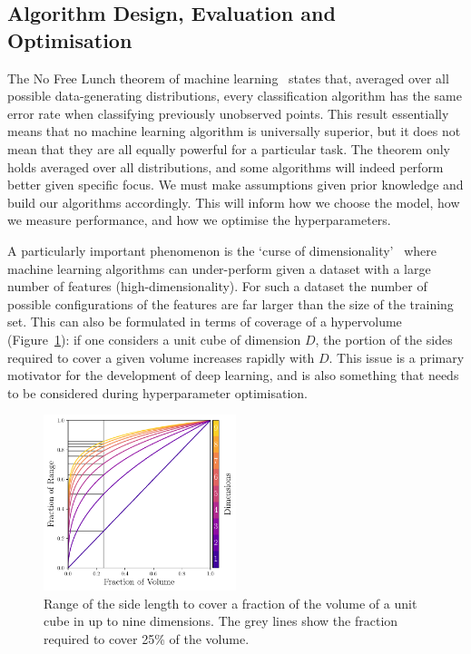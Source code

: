 \subsection{Algorithm Design, Evaluation and Optimisation}

The No Free Lunch theorem of machine learning~\cite{NoFreeLunch} states that, averaged over all possible data-generating distributions, every classification algorithm has the same error rate when classifying previously unobserved points.
This result essentially means that no machine learning algorithm is universally superior, but it does not mean that they are all equally powerful for a particular task. 
The theorem only holds averaged over all distributions, and some algorithms will indeed perform better given specific focus. We must make assumptions given prior knowledge and build our algorithms accordingly.
This will inform how we choose the model, how we measure performance, and how we optimise the hyperparameters. 


A particularly important phenomenon is the `curse of dimensionality'~\cite{elementsOfStatsLearning} where machine learning algorithms can under-perform given a dataset with a large number of features (high-dimensionality).
For such a dataset the number of possible configurations of the features are far larger than the size of the training set. 
This can also be formulated in terms of coverage of a hypervolume (Figure~\ref{fig:machine_learning:curse_of_dimensionality}): if one considers a unit cube of dimension $D$, the portion of the sides required to cover a given volume increases rapidly with $D$.
This issue is a primary motivator for the development of deep learning, and is also something that needs to be considered during hyperparameter optimisation. 
\begin{figure}[h!]
    \begin{center}
        \includegraphics[width=0.5\textwidth]{figures/machine_learning/curse_of_dimensionality.pdf}
    \end{center}
    \caption{Range of the side length to cover a fraction of the volume of a unit cube in up to nine dimensions. The grey lines show the fraction required to cover 25\% of the volume.}
        \label{fig:machine_learning:curse_of_dimensionality}
\end{figure}


